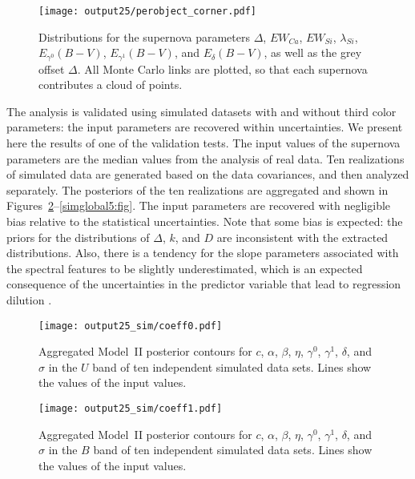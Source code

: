 \documentclass{aastex61}   	%
\begin{document}
\begin{figure}[htbp] %
   \centering
   \texttt{[image: output25/perobject\_corner.pdf]} 
   \caption{
   Distributions for the supernova parameters $\Delta$, $EW_{Ca}$, $EW_{Si}$, $\lambda_{Si}$, $E_{\gamma^0}(B-V)$,  $E_{\gamma^1}(B-V)$,  and $E_{\delta}(B-V)$, as well as the grey offset
$\Delta$.  All Monte Carlo links are plotted, so that each supernova contributes a cloud of points.
   \label{perobject2:fig}}
\end{figure}

\color{black}
The analysis is validated using simulated datasets with and without third color parameters: the input parameters are recovered within  uncertainties.
We present here the results of one of the validation tests.  The input values of the supernova parameters are the median values from the analysis of real data.
Ten realizations of simulated data are generated based on the data covariances, and then analyzed separately.   The posteriors of the ten realizations
are aggregated and shown in Figures~\ref{simglobal1:fig}--\ref{simglobal5:fig}.  The input parameters are recovered with negligible bias
relative to the statistical uncertainties. 
\color{purple}
Note that some bias is expected: the priors for the distributions of $\Delta$, $k$, and $D$ are inconsistent
with the extracted distributions.  Also, 
there is a tendency for the slope parameters associated with the spectral features to be slightly underestimated, which is an expected consequence of 
the uncertainties in the predictor variable that lead to 
regression dilution \citep{spearman04}. 
\color{black}

\begin{figure}[htbp] %
   \centering
   \texttt{[image: output25\_sim/coeff0.pdf]} 
            \caption{Aggregated Model~II posterior contours for $c$, $\alpha$, $\beta$, $\eta$, $\gamma^0$, $\gamma^1$,  $\delta$, and $\sigma$ in the $U$ band of ten independent simulated data sets.  Lines show the values of the input values.
            \label{simglobal1:fig}}
\end{figure}

\begin{figure}[htbp] %
   \centering
   \texttt{[image: output25\_sim/coeff1.pdf]} 
            \caption{Aggregated Model~II posterior contours for $c$, $\alpha$, $\beta$, $\eta$, $\gamma^0$, $\gamma^1$,  $\delta$, and $\sigma$ in the $B$ band of ten independent simulated data sets.   Lines show the values of the input values.
 \label{simglobal2:fig}}
\end{figure}
\end{document}

